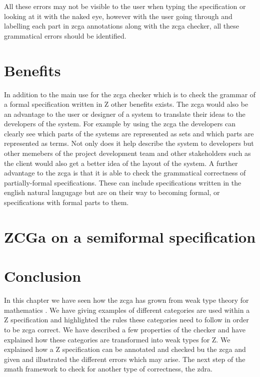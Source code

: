 All these errors may not be visible to the user when typing the specification or looking at it with the naked eye, however with the user going through and labelling each part in \gls{zcga} annotations along with the \gls{zcga} checker, all these grammatical errors should be identified.


\section{Benefits}

In addition to the main use for the \gls{zcga} checker which is to check the grammar of a formal specification written in Z other benefits exists. The \gls{zcga} would also be an advantage to the user or designer of a system to translate their ideas to the developers of the system. For example by using the \gls{zcga} the developers can clearly see which parts of the systems are represented as sets and which parts are represented as terms. Not only does it help describe the system to developers but other memebers of the project development team and other stakeholders such as the client would also get a better idea of the layout of the system.
A further advantage to the \gls{zcga} is that it is able to check the grammatical correctness of partially-formal specifications. These can include specifications written in the english natural langugage but are on their way to becoming formal, or specifications with formal parts to them.

\section{ZCGa on a semiformal specification}


\section{Conclusion}
In this chapter we have seen how the \gls{zcga} has grown from weak type theory for mathematics \cite{wtt}. We have giving examples of different categories are used within a Z specification and highlighted the rules these categories need to follow in order to be \gls{zcga} correct. We have described a few properties of the checker and have explained how these categories are transformed into weak types for Z. We explained how a Z specification can be annotated and checked bu the \gls{zcga} and given and illustrated the different errors which may arise. The next step of the \gls{zmath} framework to check for another type of correctness, the \gls{zdra}.
